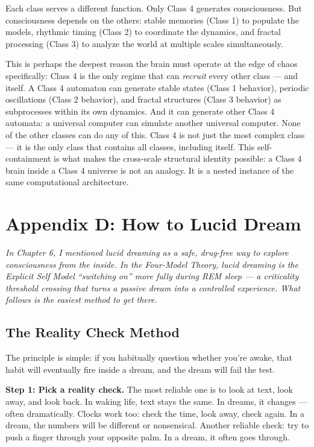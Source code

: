 \documentclass[11pt, twoside, openright]{book}
\begin{document}
Each class serves a different function. Only Class 4 generates consciousness. But consciousness depends on the others: stable memories (Class 1) to populate the models, rhythmic timing (Class 2) to coordinate the dynamics, and fractal processing (Class 3) to analyze the world at multiple scales simultaneously.

This is perhaps the deepest reason the brain must operate at the edge of chaos specifically: Class 4 is the only regime that can \textit{recruit} every other class --- and itself. A Class 4 automaton can generate stable states (Class 1 behavior), periodic oscillations (Class 2 behavior), and fractal structures (Class 3 behavior) as subprocesses within its own dynamics. And it can generate other Class 4 automata: a universal computer can simulate another universal computer. None of the other classes can do any of this. Class 4 is not just the most complex class --- it is the only class that contains all classes, including itself. This self-containment is what makes the cross-scale structural identity possible: a Class 4 brain inside a Class 4 universe is not an analogy. It is a nested instance of the same computational architecture.


\chapter*{Appendix D: How to Lucid Dream}

\textit{In Chapter 6, I mentioned lucid dreaming as a safe, drug-free way to explore consciousness from the inside. In the Four-Model Theory, lucid dreaming is the Explicit Self Model ``switching on'' more fully during REM sleep --- a criticality threshold crossing that turns a passive dream into a controlled experience. What follows is the easiest method to get there.}

\section*{The Reality Check Method}

The principle is simple: if you habitually question whether you're awake, that habit will eventually fire inside a dream, and the dream will fail the test.

\textbf{Step 1: Pick a reality check.} The most reliable one is to look at text, look away, and look back. In waking life, text stays the same. In dreams, it changes --- often dramatically. Clocks work too: check the time, look away, check again. In a dream, the numbers will be different or nonsensical. Another reliable check: try to push a finger through your opposite palm. In a dream, it often goes through.
\end{document}
